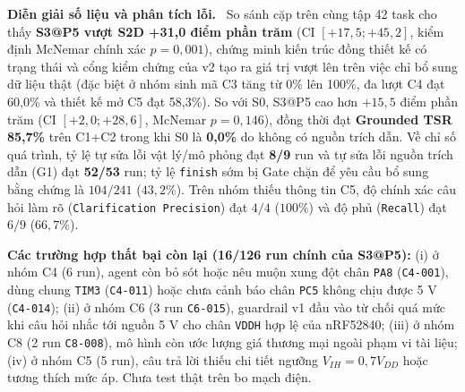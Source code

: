 \documentclass[12pt,a4paper]{report}
\newcommand{\file}[1]{{\small\ttfamily\color{bkblue}\nolinkurl{#1}}}
\newcommand{\subhead}[1]{\par\smallskip\noindent\textbf{#1}\ }
\begin{document}
\clearpage
\subhead{Diễn giải số liệu và phân tích lỗi.} So sánh cặp trên cùng tập 42 task cho thấy \textbf{S3@P5 vượt S2D +31,0 điểm phần trăm} (CI $[+17,5; +45,2]$, kiểm định McNemar chính xác $p=0,001$), chứng minh kiến trúc đồng thiết kế có trạng thái và cổng kiểm chứng của v2 tạo ra giá trị vượt lên trên việc chỉ bổ sung dữ liệu thật (đặc biệt ở nhóm sinh mã C3 tăng từ 0\% lên 100\%, đa lượt C4 đạt 60,0\% và thiết kế mở C5 đạt 58,3\%). So với S0, S3@P5 cao hơn $+15,5$ điểm phần trăm (CI $[+2,0; +28,6]$, McNemar $p=0,146$), đồng thời đạt \textbf{Grounded TSR 85,7\%} trên C1+C2 trong khi S0 là \textbf{0,0\%} do không có nguồn trích dẫn. Về chỉ số quá trình, tỷ lệ tự sửa lỗi vật lý/mô phỏng đạt \textbf{8/9} run và tự sửa lỗi nguồn trích dẫn (G1) đạt \textbf{52/53} run; tỷ lệ \file{finish} sớm bị Gate chặn để yêu cầu bổ sung bằng chứng là $104/241$ ($43,2\%$). Trên nhóm thiếu thông tin C5, độ chính xác câu hỏi làm rõ (\file{Clarification Precision}) đạt $4/4$ ($100\%$) và độ phủ (\file{Recall}) đạt $6/9$ ($66,7\%$).

\textbf{Các trường hợp thất bại còn lại (16/126 run chính của S3@P5):} (i) ở nhóm C4 (6 run), agent còn bỏ sót hoặc nêu muộn xung đột chân \file{PA8} (\file{C4-001}), dùng chung \file{TIM3} (\file{C4-011}) hoặc chưa cảnh báo chân \file{PC5} không chịu được 5 V (\file{C4-014}); (ii) ở nhóm C6 (3 run \file{C6-015}), guardrail v1 đầu vào từ chối quá mức khi câu hỏi nhắc tới nguồn 5 V cho chân \file{VDDH} hợp lệ của nRF52840; (iii) ở nhóm C8 (2 run \file{C8-008}), mô hình còn ước lượng giá thương mại ngoài phạm vi tài liệu; (iv) ở nhóm C5 (5 run), câu trả lời thiếu chi tiết ngưỡng $V_{IH} = 0,7 V_{DD}$ hoặc tương thích mức áp. Chưa test thật trên bo mạch điện.
\end{document}
